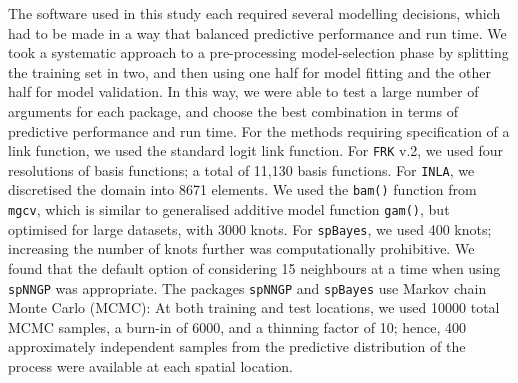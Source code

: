 \documentclass[12pt,a4paper]{article}
\begin{document}
The software used in this study each required several modelling decisions, which had to be made in a way that balanced predictive performance and run time. 
 We took a systematic approach to a pre-processing model-selection phase by splitting the training set in two, and then using one half for model fitting and the other half for model validation. 
 In this way, we were able to test a large number of arguments for each package, and choose the best combination in terms of predictive performance and run time. 
 For the methods requiring specification of a link function, we used the standard logit link function.
 For \texttt{FRK} v.2, we used four resolutions of basis functions; a total of 11,130 basis functions. 
 For \texttt{INLA}, we discretised the domain into 8671 elements.
 We used the \texttt{bam()} function from \texttt{mgcv}, which is similar to generalised additive model function \texttt{gam()}, but optimised for large datasets, with 3000 knots. 
For \texttt{spBayes}, we used 400 knots; increasing the number of knots further was computationally prohibitive. 
 We found that the default option of considering 15 neighbours at a time when using \texttt{spNNGP} was appropriate.
 The packages \texttt{spNNGP} and \texttt{spBayes} use Markov chain Monte Carlo (MCMC):
At both training and test locations, we used 10000 total MCMC samples, a burn-in of 6000, and a thinning factor of 10; hence, 400 approximately independent samples from the predictive distribution of the process were available at each spatial location. 
\end{document}
